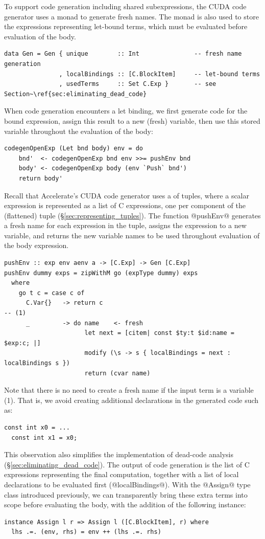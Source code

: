 To support code generation including shared subexpressions, the CUDA code
generator uses a monad to generate fresh names. The monad is also used to store
the expressions representing let-bound terms, which must be evaluated before
evaluation of the body.
%
\begin{lstlisting}[style=haskell]
data Gen = Gen { unique        :: Int               -- fresh name generation
               , localBindings :: [C.BlockItem]     -- let-bound terms
               , usedTerms     :: Set C.Exp }       -- see Section~\ref{sec:eliminating_dead_code}
\end{lstlisting}

When code generation encounters a let binding, we first generate code for the
bound expression, assign this result to a new (fresh) variable, then use this
stored variable throughout the evaluation of the body:
%
\begin{lstlisting}[style=haskell]
codegenOpenExp (Let bnd body) env = do
    bnd'  <- codegenOpenExp bnd env >>= pushEnv bnd
    body' <- codegenOpenExp body (env `Push` bnd')
    return body'
\end{lstlisting}

Recall that Accelerate's CUDA code generator uses a  of tuples, where a scalar expression is represented as a list of
C expressions, one per component of the (flattened) tuple
(\S\ref{sec:representing_tuples}). The function @pushEnv@ generates a fresh name
for each expression in the tuple, assigns the expression to a new variable, and
returns the new variable names to be used throughout evaluation of the body
expression.
%
\begin{lstlisting}[style=haskell]
pushEnv :: exp env aenv a -> [C.Exp] -> Gen [C.Exp]
pushEnv dummy exps = zipWithM go (expType dummy) exps
  where
    go t c = case c of
      C.Var{}   -> return c                                                        -- (1)
      _         -> do name    <- fresh
                      let next = [citem| const $ty:t $id:name = $exp:c; |]
                      modify (\s -> s { localBindings = next : localBindings s })
                      return (cvar name)
\end{lstlisting}
%
Note that there is no need to create a fresh name if the input term is a
variable (1). That is, we avoid creating additional declarations in the
generated code such as:
%
\begin{lstlisting}[language=cuda]
  const int x0 = ...
  const int x1 = x0;
\end{lstlisting}
%
This observation also simplifies the implementation of dead-code analysis
(\S\ref{sec:eliminating_dead_code}). The output of code generation is the list
of C expressions representing the final computation, together with a list of
local declarations to be evaluated first (@localBindings@). With the @Assign@
type class introduced previously, we can transparently bring these extra terms
into scope before evaluating the body, with the addition of the following
instance:
%
\begin{lstlisting}[style=haskell]
instance Assign l r => Assign l ([C.BlockItem], r) where
  lhs .=. (env, rhs) = env ++ (lhs .=. rhs)
\end{lstlisting}


